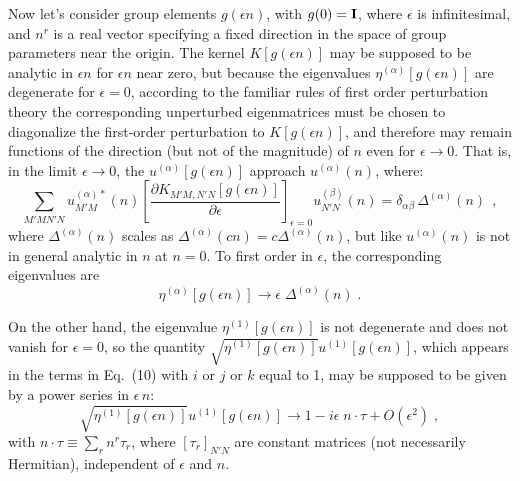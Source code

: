 Now let's consider  group elements $g(\epsilon n)$, with  $g(0)={\bf I}$, where $\epsilon$ is infinitesimal, and $n^r$ is a real vector specifying a fixed direction in the space of group parameters near the origin. 
  The kernel $K[g(\epsilon n)]$ may be supposed to be analytic in $\epsilon n$ for $\epsilon n$ near zero, but because the eigenvalues $\eta^{(\alpha)}[g(\epsilon n)]$ are degenerate for $\epsilon=0$, according to the familiar rules of first order perturbation theory the corresponding unperturbed eigenmatrices  must be chosen to diagonalize the first-order perturbation to $K[g(\epsilon n)]$, and  therefore may remain functions of the direction (but not of the magnitude) of $n$ even  for $\epsilon\rightarrow 0$.  That is, in the limit $\epsilon\rightarrow 0$, the   $u^{(\alpha)}[g(\epsilon n)]$ approach $u^{(\alpha)}(n)$, where:
\begin{equation}
\sum_{M'M N'N} u^{(\alpha)*}_{M'M}(n)\left[\frac{\partial K_{M'M ,N'N}[g(\epsilon n)]}{\partial \epsilon}\right]_{\epsilon=0}u^{(\beta)}_{N'N}(n)=\delta_{\alpha\beta}\,\Delta^{(\alpha)}(n)\,\;,
\end{equation}
where $\Delta^{(\alpha)}(n)$   scales as $\Delta^{(\alpha)}(c n)=c\Delta^{(\alpha)}(n)$, but like $u^{(\alpha)}(n)$ is not in general analytic in $n$ at $n=0$.  To first order in $\epsilon$, the corresponding eigenvalues are
\begin{equation}
\eta^{(\alpha)}[g(\epsilon n)]\rightarrow \epsilon\; \Delta^{(\alpha)}(n)\;.
\end{equation}


On the other hand, the eigenvalue $\eta^{(1)}[g(\epsilon n)]$ is not degenerate and does not vanish for $\epsilon=0$, so the quantity $\sqrt{\eta^{(1)}[g(\epsilon n)]}u^{(1)}[g(\epsilon n)]$, which appears in the terms in Eq.~(10) with $i$ or $j$ or $k$ equal to 1, may be supposed to be given by a power series in $\epsilon\,n$:
\begin{equation}
\sqrt{\eta^{(1)}[g(\epsilon n)]}u^{(1)}[g(\epsilon n)]\rightarrow 1-i\epsilon \;n\cdot \tau+O(\epsilon^2)\;,
\end{equation}
with $n\cdot \tau\equiv \sum_r n^r\tau_r$, where $[\tau_r]_{N'N}$  are constant matrices (not necessarily Hermitian),  independent of $\epsilon$ and $n$.  

